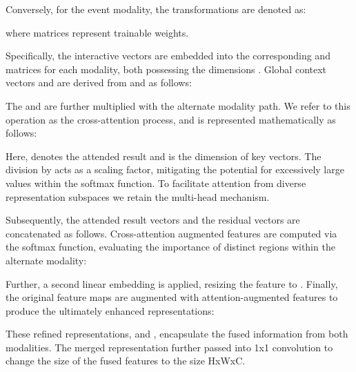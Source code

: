 \documentclass[lettersize,journal]{IEEEtran}
\begin{document}
Conversely, for the event modality, the transformations are denoted as:








where  matrices represent trainable weights.

Specifically, the interactive  vectors are embedded into the corresponding  and  matrices for each modality, both possessing the dimensions . Global context vectors  and  are derived from  and  as follows: 








The  and  are further multiplied with the alternate modality path.  We refer to this operation as the cross-attention process, and is represented mathematically as follows:









Here,  denotes the attended result and  is the dimension of key vectors. The division by  acts as a scaling factor, mitigating the potential for excessively large values within the softmax function. To facilitate attention from diverse representation subspaces we retain the multi-head mechanism.



Subsequently, the attended result vectors  and the residual vectors  are concatenated as follows. Cross-attention augmented features are computed via the softmax function, evaluating the importance of distinct regions within the alternate modality:











Further, a second linear embedding is applied, resizing the feature to . Finally, the original feature maps are augmented with attention-augmented features to produce the ultimately enhanced representations:







These refined representations,  and , encapsulate the fused information from both modalities. The merged representation further passed into 1x1 convolution to change the size of the fused features  to the size HxWxC.
\end{document}
